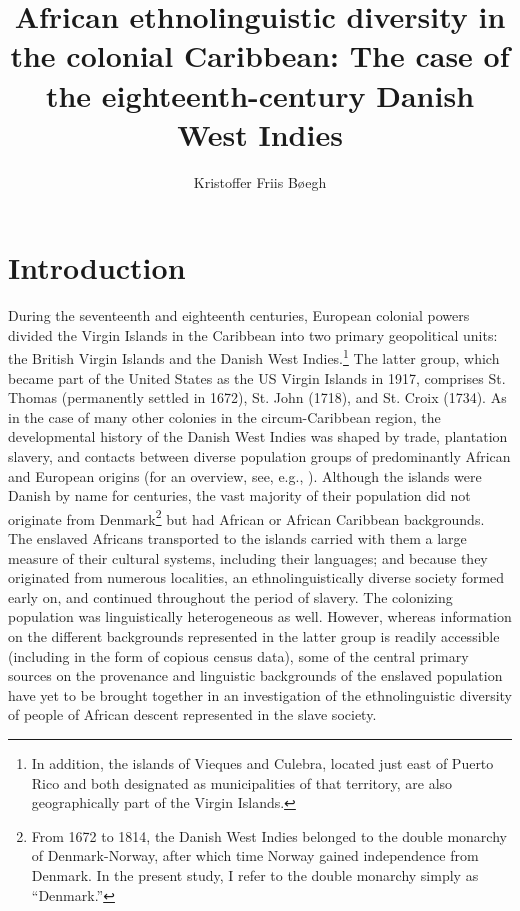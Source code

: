 \documentclass[output=paper,colorlinks,citecolor=brown]{langscibook}
\author{Kristoffer Friis Bøegh\orcid{}\affiliation{Utrecht University;Aarhus University}}
\title[African ethnolinguistic diversity in the colonial Caribbean]
      {African ethnolinguistic diversity in the colonial Caribbean: The case of the eighteenth-century Danish West Indies}
\begin{document}
\maketitle

\section{Introduction}

During the seventeenth and eighteenth centuries, European colonial powers divided the Virgin Islands in the Caribbean into two primary geopolitical units: the British Virgin Islands and the Danish West Indies.\footnote{In addition, the islands of Vieques and Culebra, located just east of Puerto Rico and both designated as municipalities of that territory, are also geographically part of the Virgin Islands.} The latter group, which became part of the United States as the US Virgin Islands in 1917, comprises St. Thomas (permanently settled in 1672), St. John (1718), and St. Croix (1734). As in the case of many other colonies in the circum-Caribbean region, the developmental history of the Danish West Indies was shaped by trade, plantation slavery, and contacts between diverse population groups of predominantly African and European origins (for an overview, see, e.g., \cite{JensenSimonsen_2016}). Although the islands were Danish by name for centuries, the vast majority of their population did not originate from Denmark\footnote{From 1672 to 1814, the Danish West Indies belonged to the double monarchy of Denmark-Norway, after which time Norway gained independence from Denmark. In the present study, I refer to the double monarchy simply as “Denmark.”} but had African or African Caribbean backgrounds. The enslaved Africans transported to the islands carried with them a large measure of their cultural systems, including their languages; and because they originated from numerous localities, an ethnolinguistically diverse society formed early on, and continued throughout the period of slavery. The colonizing population was linguistically heterogeneous as well. However, whereas information on the different backgrounds represented in the latter group is readily accessible (including in the form of copious census data), some of the central primary sources on the provenance and linguistic backgrounds of the enslaved population have yet to be brought together in an investigation of the ethnolinguistic diversity of people of African descent represented in the slave society.
\end{document}
